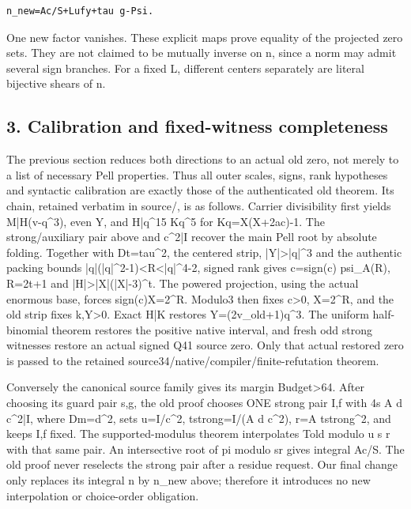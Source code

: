 \begingroup\small
\begin{verbatim}
n_new=Ac/S+Lufy+tau g-Psi.
\end{verbatim}
\endgroup

One new factor vanishes. These explicit maps prove equality of the
projected zero sets. They are not claimed to be mutually inverse on n,
since a norm may admit several sign branches. For a fixed L, different
centers separately are literal bijective shears of n.

\subsection{3. Calibration and fixed-witness completeness}

The previous section reduces both directions to an actual old zero, not merely
to a list of necessary Pell properties. Thus all outer scales, signs, rank
hypotheses and syntactic calibration are exactly those of the authenticated
old theorem. Its chain, retained verbatim in source/, is as follows.
Carrier divisibility first yields M|H(v-q\textasciicircum{}3), even Y, and
H|q\textasciicircum{}15 Kq\textasciicircum{}5 for Kq=X(X+2ac)-1. The strong/auxiliary pair above and
c\textasciicircum{}2|I recover the main Pell root by absolute folding. Together with
Dt=tau\textasciicircum{}2, the centered strip, |Y|>|q|\textasciicircum{}3 and the authentic packing bounds
|q|(|q|\textasciicircum{}2-1)<R<|q|\textasciicircum{}4-2, signed rank gives c=sign(c) psi\_A(R),
R=2t+1 and |H|>|X|(|X|-3)\textasciicircum{}t. The powered projection, using the
actual enormous base, forces sign(c)X=2\textasciicircum{}R. Modulo3 then fixes c>0,
X=2\textasciicircum{}R, and the old strip fixes k,Y>0. Exact H|K restores
Y=(2v\_old+1)q\textasciicircum{}3. The uniform half-binomial theorem restores the
positive native interval, and fresh odd strong witnesses restore an
actual signed Q41 source zero. Only that actual restored zero is passed
to the retained source34/native/compiler/finite-refutation theorem.

Conversely the canonical source family gives its margin Budget>64.
After choosing its guard pair s,g, the old proof chooses ONE strong pair
I,f with 4s A d c\textasciicircum{}2|I, where Dm=d\textasciicircum{}2, sets
u=I/c\textasciicircum{}2, tstrong=I/(A d c\textasciicircum{}2), r=A tstrong\textasciicircum{}2, and keeps I,f fixed.
The supported-modulus theorem interpolates Told modulo u s r with
that same pair. An intersective root of pi modulo sr gives integral
Ac/S. The old proof never reselects the strong pair after a residue
request. Our final change only replaces its integral n by n\_new above;
therefore it introduces no new interpolation or choice-order obligation.

